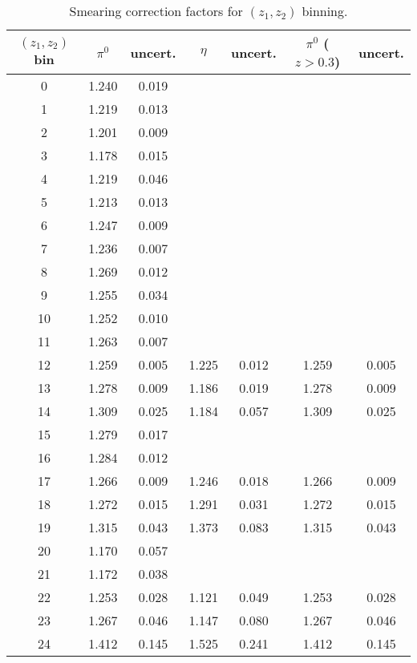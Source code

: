 \begin{table}[H]\footnotesize
\centering
\begin{tabular}{|c||c|c||c|c||c|c|}
\hline
$(z_1,z_2)$ bin & $\pi^0$ &  uncert. 	& $\eta$  	&  uncert. 	& $\pi^0$  ($z>0.3$) &uncert.  \\ \hline
0	&	1.240	&	0.019	&		&		&		&		\\ \hline
1	&	1.219	&	0.013	&		&		&		&		\\ \hline
2	&	1.201	&	0.009	&		&		&		&		\\ \hline
3	&	1.178	&	0.015	&		&		&		&		\\ \hline
4	&	1.219	&	0.046	&		&		&		&		\\ \hline \hline
5	&	1.213	&	0.013	&		&		&		&		\\ \hline
6	&	1.247	&	0.009	&		&		&		&		\\ \hline
7	&	1.236	&	0.007	&		&		&		&		\\ \hline
8	&	1.269	&	0.012	&		&		&		&		\\ \hline
9	&	1.255	&	0.034	&		&		&		&		\\ \hline \hline
10	&	1.252	&	0.010	&		&		&		&		\\ \hline
11	&	1.263	&	0.007	&		&		&		&		\\ \hline
12	&	1.259	&	0.005	&	1.225	&	0.012	&	1.259	&	0.005	\\ \hline
13	&	1.278	&	0.009	&	1.186	&	0.019	&	1.278	&	0.009	\\ \hline
14	&	1.309	&	0.025	&	1.184	&	0.057	&	1.309	&	0.025	\\ \hline \hline
15	&	1.279	&	0.017	&		&		&		&		\\ \hline
16	&	1.284	&	0.012	&		&		&		&		\\ \hline
17	&	1.266	&	0.009	&	1.246	&	0.018	&	1.266	&	0.009	\\ \hline
18	&	1.272	&	0.015	&	1.291	&	0.031	&	1.272	&	0.015	\\ \hline
19	&	1.315	&	0.043	&	1.373	&	0.083	&	1.315	&	0.043	\\ \hline \hline
20	&	1.170	&	0.057	&		&		&		&		\\ \hline
21	&	1.172	&	0.038	&		&		&		&		\\ \hline
22	&	1.253	&	0.028	&	1.121	&	0.049	&	1.253	&	0.028	\\ \hline
23	&	1.267	&	0.046	&	1.147	&	0.080	&	1.267	&	0.046	\\ \hline
24	&	1.412	&	0.145	&	1.525	&	0.241	&	1.412	&	0.145	\\ \hline
\end{tabular}
\caption{Smearing correction factors for $(z_1,z_2)$ binning.}
\label{tab:comz_smearing_info}
\end{table}

